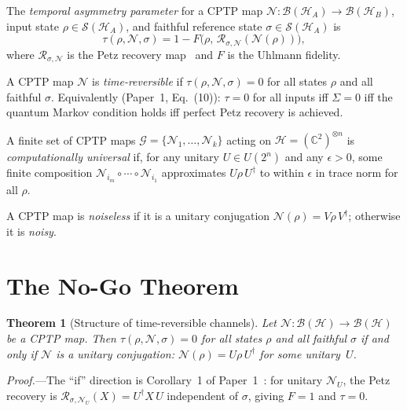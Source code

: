 \documentclass[prl,twocolumn,superscriptaddress,longbibliography,floatfix]{revtex4-2}
\newtheorem{theorem}{Theorem}
\newcommand{\Petz}{\mathcal{R}}
\newcommand{\chan}{\mathcal{N}}
\newcommand{\hilb}{\mathcal{H}}
\newcommand{\tauasym}{\tau}
\begin{document}
The \emph{temporal asymmetry parameter} for a CPTP map
$\chan: \mathcal{B}(\hilb_A) \to \mathcal{B}(\hilb_B)$, input state
$\rho \in \mathcal{S}(\hilb_A)$, and faithful reference state
$\sigma \in \mathcal{S}(\hilb_A)$ is
\begin{equation}
\tauasym(\rho, \chan, \sigma)
= 1 - F\!\big(\rho,\, \Petz_{\sigma,\chan}(\chan(\rho))\big),
\label{eq:tau_def}
\end{equation}
where $\Petz_{\sigma,\chan}$ is the Petz recovery
map~\cite{Petz1986,Petz1988} and $F$ is the Uhlmann fidelity.

A CPTP map $\chan$ is \emph{time-reversible} if
$\tauasym(\rho, \chan, \sigma) = 0$ for all states $\rho$ and all
faithful $\sigma$.  Equivalently (Paper~1, Eq.~(10)):
$\tauasym = 0$ for all inputs iff $\Sigma = 0$ iff the quantum Markov
condition holds iff perfect Petz recovery is achieved.

A finite set of CPTP maps
$\mathcal{G} = \{\chan_1, \ldots, \chan_k\}$ acting on
$\hilb = (\mathbb{C}^2)^{\otimes n}$ is \emph{computationally
universal} if, for any unitary $U \in U(2^n)$ and any $\epsilon > 0$,
some finite composition
$\chan_{i_m} \circ \cdots \circ \chan_{i_1}$
approximates $U\rho\,U^\dagger$ to within $\epsilon$ in trace norm
for all $\rho$.

A CPTP map is \emph{noiseless} if it is a unitary conjugation
$\chan(\rho) = V\rho\,V^\dagger$; otherwise it is \emph{noisy}.

\section{The No-Go Theorem}
\label{sec:nogo}

\begin{theorem}[Structure of time-reversible channels]
\label{thm:structure}
Let\/ $\chan: \mathcal{B}(\hilb) \to \mathcal{B}(\hilb)$ be a CPTP
map.  Then
$\tauasym(\rho, \chan, \sigma) = 0$ for all states $\rho$ and all
faithful $\sigma$ if and only if\/ $\chan$ is a unitary conjugation:
$\chan(\rho) = U\rho\,U^\dagger$ for some unitary~$U$.
\end{theorem}

\emph{Proof.}---The ``if'' direction is Corollary~1 of
Paper~1~\cite{Huang2026a}: for unitary $\chan_U$, the Petz recovery is
$\Petz_{\sigma,\chan_U}(X) = U^\dagger X\,U$ independent of $\sigma$,
giving $F = 1$ and $\tauasym = 0$.
\end{document}
